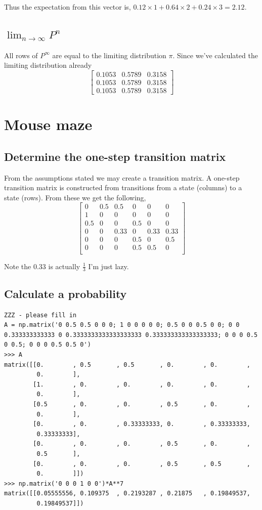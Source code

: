 \documentclass{article}
\begin{document}
Thus the expectation from this vector is,
$0.12 \times 1 + 0.64 \times 2 + 0.24 \times 3 = 2.12$.

\subsection{$\lim_{n \to \infty} P^n$}
All rows of $P^\infty$ are equal to the limiting distribution $\pi$.
Since we've calculated the limiting distribution already
\[
    \begin{bmatrix}
        0.1053 & 0.5789 & 0.3158 \\
        0.1053 & 0.5789 & 0.3158 \\
        0.1053 & 0.5789 & 0.3158
    \end{bmatrix}
\]

\section{Mouse maze}
\subsection{Determine the one-step transition matrix}
From the assumptions stated we may create a transition matrix.
A one-step transition matrix is constructed from transitions
from a state (columns) to a state (rows). From these we get the following,
\[
    \begin{bmatrix}
        0 & 0.5 & 0.5 & 0 & 0 & 0 \\
        1 & 0 & 0 & 0 & 0 & 0 \\
        0.5 & 0 & 0 & 0.5 & 0 & 0 \\
        0 & 0 & 0.33 & 0 & 0.33 & 0.33 \\
        0 & 0 & 0 & 0.5 & 0 & 0.5 \\
        0 & 0 & 0 & 0.5 & 0.5 & 0 \\
    \end{bmatrix}
\]

Note the $0.33$ is actually $\frac{1}{3}$ I'm just lazy.

\subsection{Calculate a probability}
\begin{verbatim}
ZZZ - please fill in
A = np.matrix('0 0.5 0.5 0 0 0; 1 0 0 0 0 0; 0.5 0 0 0.5 0 0; 0 0 0.333333333333 0 0.3333333333333333333 0.333333333333333333; 0 0 0 0.5 0 0.5; 0 0 0 0.5 0.5 0')
>>> A
matrix([[0.        , 0.5       , 0.5       , 0.        , 0.        ,
         0.        ],
        [1.        , 0.        , 0.        , 0.        , 0.        ,
         0.        ],
        [0.5       , 0.        , 0.        , 0.5       , 0.        ,
         0.        ],
        [0.        , 0.        , 0.33333333, 0.        , 0.33333333,
         0.33333333],
        [0.        , 0.        , 0.        , 0.5       , 0.        ,
         0.5       ],
        [0.        , 0.        , 0.        , 0.5       , 0.5       ,
         0.        ]])
>>> np.matrix('0 0 0 1 0 0')*A**7
matrix([[0.05555556, 0.109375  , 0.2193287 , 0.21875   , 0.19849537,
         0.19849537]])
\end{verbatim}
\end{document}
